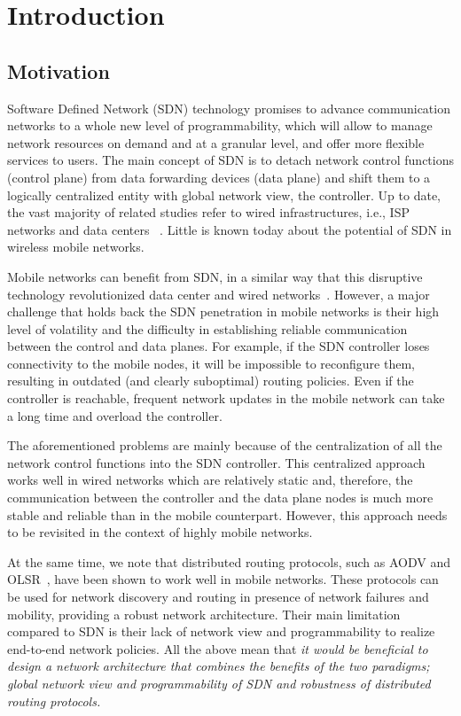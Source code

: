 
\section{Introduction} \label{section:introduction}

\subsection{Motivation}

Software Defined Network (SDN) technology promises to advance communication networks to a whole new level of programmability, which will allow to manage network resources on demand and at a granular level, and offer more flexible services to users. The main concept of SDN is to detach network control functions (control plane) from data forwarding devices (data plane) and shift them to a logically centralized entity with global network view, the controller. Up to date, the vast majority of related studies refer to wired infrastructures, i.e., ISP networks and data centers ~\cite{sdn-survey}. Little is known today about the potential of SDN in wireless mobile networks.

Mobile networks can benefit from SDN, in a similar way that this disruptive technology revolutionized data center and wired networks~\cite{sdn-b4}. 
However, a major challenge that holds back the SDN penetration in mobile networks is their high level of volatility and the difficulty in establishing reliable communication between the control and data planes. For example, if the SDN controller loses connectivity to the mobile nodes, it will be impossible to reconfigure them, resulting in outdated (and clearly suboptimal) routing policies. Even if the controller is reachable, frequent network updates in the mobile network can take a long time and overload the controller.

The aforementioned problems are mainly because of the centralization of all the network control functions into the SDN controller. This centralized approach works well in wired networks which are relatively static and, therefore, the communication between the controller and the data plane nodes is much more stable and reliable than in the mobile counterpart. However, this approach needs to be revisited in the context of highly mobile networks.

At the same time, we note that distributed routing protocols, such as AODV and OLSR~\cite{manet-survey}, have been shown to work well in mobile networks. These protocols can be used for network discovery and routing in presence of network failures and mobility, providing a robust network architecture. Their main limitation compared to SDN is their lack of network view and programmability to realize end-to-end network policies. All the above mean that \emph{it would be beneficial to design a network architecture that combines the benefits of the two paradigms; global network view and programmability of SDN and robustness of distributed routing protocols.}

